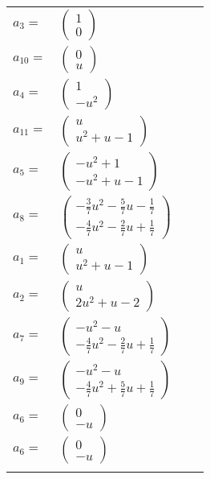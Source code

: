 \documentclass[1p]{elsarticle_modified}
\theoremstyle{definition}
\begin{document}
\begin{tabular}{m{7pt} m{180pt} m{7pt} m{180pt} }
\flushright $a_{3}=$&$\begin{pmatrix}1\\0\end{pmatrix}$ \\
\flushright $a_{10}=$&$\begin{pmatrix}0\\u\end{pmatrix}$ \\
\flushright $a_{4}=$&$\begin{pmatrix}1\\- u^2\end{pmatrix}$ \\
\flushright $a_{11}=$&$\begin{pmatrix}u\\u^2+u-1\end{pmatrix}$ \\
\flushright $a_{5}=$&$\begin{pmatrix}- u^2+1\\- u^2+u-1\end{pmatrix}$ \\
\flushright $a_{8}=$&$\begin{pmatrix}-\frac{3}{7} u^2-\frac{5}{7} u-\frac{1}{7}\\-\frac{4}{7} u^2-\frac{2}{7} u+\frac{1}{7}\end{pmatrix}$ \\
\flushright $a_{1}=$&$\begin{pmatrix}u\\u^2+u-1\end{pmatrix}$ \\
\flushright $a_{2}=$&$\begin{pmatrix}u\\2 u^2+u-2\end{pmatrix}$ \\
\flushright $a_{7}=$&$\begin{pmatrix}- u^2- u\\-\frac{4}{7} u^2-\frac{2}{7} u+\frac{1}{7}\end{pmatrix}$ \\
\flushright $a_{9}=$&$\begin{pmatrix}- u^2- u\\-\frac{4}{7} u^2+\frac{5}{7} u+\frac{1}{7}\end{pmatrix}$ \\
\flushright $a_{6}=$&$\begin{pmatrix}0\\- u\end{pmatrix}$\\ \flushright $a_{6}=$&$\begin{pmatrix}0\\- u\end{pmatrix}$\\&\end{tabular}
\end{document}
